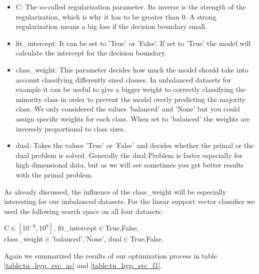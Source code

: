 \documentclass[a4paper,10pt]{article}
\begin{document}
\begin{itemize}
    \item \textsf{C}: The so-called regularization parameter. Its inverse is the strength of the regularization, which is why it has to be greater than 0. A strong regularization means a big loss if the decision boundary small.
\item \textsf{fit\_intercept}: It can be set to 'True' or 'False'. If set to 'True' the model will calculate the intercept for the decision boundary.
\item\textsf{class\_weight}: This parameter decides how much the model should take into account classifying differently sized classes. In unbalanced datasets for example it can be useful to give a bigger weight to correctly classifying the minority class in order to prevent the model overly predicting the majority class. We only considered the values 'balanced' and 'None' but you could assign specific weights for each class. When set to 'balanced' the weights are inversely proportional to class sizes.
\item \textsf{dual}: Takes the values 'True' or 'False' and decides whether the primal or the dual problem is solved. Generally the dual Problem is faster especially for high dimensional data, but as we will see sometimes you get better results with the primal problem.
\end{itemize}

As already discussed, the influence of the \textsf{class\_weight} will be especially interesting for our imbalanced datasets. For the linear support vector classifier we used the following search space on all four datasets:

\begin{center}
    \parbox{0.55\textwidth}{%
    \raggedright
    \textsf{C}\(\in[10^{-6},10^{6}]\), \textsf{fit\_intercept}\(\in\){True,False},\\ \textsf{class\_weight}\(\in\){'balanced','None'}, \textsf{dual}\(\in\){True,False}.	
    }
\end{center}

Again we summarized the results of our optimization process in table \ref{table:tu_hyp_svc_ac} and \ref{table:tu_hyp_svc_f1}.
\end{document}
